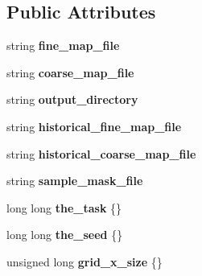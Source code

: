 \subsection*{Public Attributes}
\begin{DoxyCompactItemize}
\item 
string {\bfseries fine\+\_\+map\+\_\+file}\hypertarget{struct_sim_parameters_a24483485b1127d7c4a91f02bd56a130e}{}\label{struct_sim_parameters_a24483485b1127d7c4a91f02bd56a130e}

\item 
string {\bfseries coarse\+\_\+map\+\_\+file}\hypertarget{struct_sim_parameters_a03831d4d7590072a153620fdedd7e2fd}{}\label{struct_sim_parameters_a03831d4d7590072a153620fdedd7e2fd}

\item 
string {\bfseries output\+\_\+directory}\hypertarget{struct_sim_parameters_afc36bb2fbfc7ebf5e84149be5be87c1e}{}\label{struct_sim_parameters_afc36bb2fbfc7ebf5e84149be5be87c1e}

\item 
string {\bfseries historical\+\_\+fine\+\_\+map\+\_\+file}\hypertarget{struct_sim_parameters_a0904ed1272de111c9e80c22dcdb2e039}{}\label{struct_sim_parameters_a0904ed1272de111c9e80c22dcdb2e039}

\item 
string {\bfseries historical\+\_\+coarse\+\_\+map\+\_\+file}\hypertarget{struct_sim_parameters_a621bfeaf44861f6b88d4117bc7da5a2b}{}\label{struct_sim_parameters_a621bfeaf44861f6b88d4117bc7da5a2b}

\item 
string {\bfseries sample\+\_\+mask\+\_\+file}\hypertarget{struct_sim_parameters_ac5298525ed1d094d1668bc78491b0c69}{}\label{struct_sim_parameters_ac5298525ed1d094d1668bc78491b0c69}

\item 
long long {\bfseries the\+\_\+task} \{\}\hypertarget{struct_sim_parameters_a219ea06b17e82f1512e0e8cdd9990ea7}{}\label{struct_sim_parameters_a219ea06b17e82f1512e0e8cdd9990ea7}

\item 
long long {\bfseries the\+\_\+seed} \{\}\hypertarget{struct_sim_parameters_a689610f6fd7c87866ca950c8700b4943}{}\label{struct_sim_parameters_a689610f6fd7c87866ca950c8700b4943}

\item 
unsigned long {\bfseries grid\+\_\+x\+\_\+size} \{\}\hypertarget{struct_sim_parameters_aba773a5ec7ad130d6009d319c7d2f591}{}\label{struct_sim_parameters_aba773a5ec7ad130d6009d319c7d2f591}


\end{DoxyCompactItemize}
